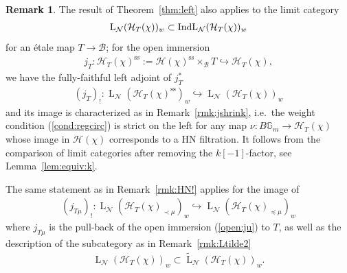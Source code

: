 \documentclass[11pt,oneside,a4paper,mathscr]{amsart}
\theoremstyle{definition}
\newtheorem{remark}[thm]{Remark}
\newcommand{\LL}{\operatorname{L}}
\newcommand{\cH}{\mathcal{H}}
\newcommand{\cB}{\mathcal{B}}
\newcommand{\bgm}{B\mathbb{G}_m}
\newcommand{\IndL}{\operatorname{IndL}}
\begin{document}
\begin{remark}\label{rmk:T}
The result of Theorem~\ref{thm:left}
    also applies to
    the limit category 
    \begin{align}\notag
    \LL_{\mathcal{N}}(\cH_T(\chi))_w \subset \IndL_{\mathcal{N}}(\cH_T(\chi))_w
\end{align}
    for an \'etale map $T\to \cB$; 
    for the open immersion 
    \begin{align*}j_T \colon \cH_T(\chi)^{\mathrm{ss}}:=\cH(\chi)^{\mathrm{ss}}\times_{\cB}T\hookrightarrow \cH_T(\chi),
    \end{align*}
    we have the 
    fully-faithful left adjoint of $j_T^*$
    \begin{align*}
(j_T)_{!} \colon \LL_{\mathcal{N}}(\cH_T(\chi)^{\mathrm{ss}})_w \hookrightarrow \LL_{\mathcal{N}}(\cH_T(\chi))_w
    \end{align*}
    and its image is characterized as in Remark~\ref{rmk:jshrink}, i.e.\ the weight condition (\ref{cond:regcirc}) is strict on the left for any 
  map $\nu \colon \bgm \to \cH_T(\chi)$
    whose image in $\cH(\chi)$ corresponds to a HN filtration. 
    It follows from the comparison of limit categories after removing the $k[-1]$-factor, 
    see Lemma~\ref{lem:equiv:k}. 
    
    The same statement as in Remark~\ref{rmk:HN!} applies for 
    the image of
    \begin{align*}
        (j_{T\mu})_{!} \colon \LL_{\mathcal{N}}(\cH_T(\chi)_{\prec \mu})_w \hookrightarrow \LL_{\mathcal{N}}(\cH_T(\chi)_{\preceq \mu})_w
    \end{align*}
    where $j_{T\mu}$ is the pull-back of the open immersion (\ref{open:ju}) to $T$, as well as the description of the subcategory
    as in Remark~\ref{rmk:Ltilde2}
    \begin{align*}
        \LL_{\mathcal{N}}(\cH_T(\chi))_w \subset \widetilde{\LL}_{\mathcal{N}}(\cH_T(\chi))_w.
    \end{align*}
\end{remark}
\end{document}
